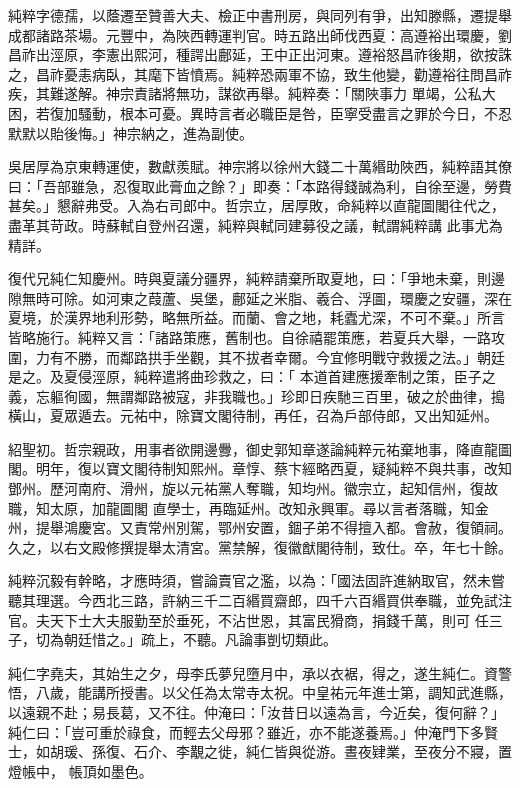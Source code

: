 \begin{pinyinscope}
 純粹字德孺，以蔭遷至贊善大夫、檢正中書刑房，與同列有爭，出知滕縣，遷提舉成都諸路茶場。元豐中，為陜西轉運判官。時五路出師伐西夏：高遵裕出環慶，劉昌祚出涇原，李憲出熙河，種諤出鄜延，王中正出河東。遵裕怒昌祚後期，欲按誅之，昌祚憂恚病臥，其麾下皆憤焉。純粹恐兩軍不協，致生他變，勸遵裕往問昌祚疾，其難遂解。神宗責諸將無功，謀欲再舉。純粹奏：「關陜事力
 單竭，公私大困，若復加騷動，根本可憂。異時言者必職臣是咎，臣寧受盡言之罪於今日，不忍默默以貽後悔。」神宗納之，進為副使。



 吳居厚為京東轉運使，數獻羨賦。神宗將以徐州大錢二十萬緡助陜西，純粹語其僚曰：「吾部雖急，忍復取此膏血之餘？」即奏：「本路得錢誠為利，自徐至邊，勞費甚矣。」懇辭弗受。入為右司郎中。哲宗立，居厚敗，命純粹以直龍圖閣往代之，盡革其苛政。時蘇軾自登州召還，純粹與軾同建募役之議，軾謂純粹講
 此事尤為精詳。



 復代兄純仁知慶州。時與夏議分疆界，純粹請棄所取夏地，曰：「爭地未棄，則邊隙無時可除。如河東之葭蘆、吳堡，鄜延之米脂、羲合、浮圖，環慶之安疆，深在夏境，於漢界地利形勢，略無所益。而蘭、會之地，耗蠹尤深，不可不棄。」所言皆略施行。純粹又言：「諸路策應，舊制也。自徐禧罷策應，若夏兵大舉，一路攻圍，力有不勝，而鄰路拱手坐觀，其不拔者幸爾。今宜修明戰守救援之法。」朝廷是之。及夏侵涇原，純粹遣將曲珍救之，曰：「
 本道首建應援牽制之策，臣子之義，忘軀徇國，無謂鄰路被寇，非我職也。」珍即日疾馳三百里，破之於曲律，搗橫山，夏眾遁去。元祐中，除寶文閣待制，再任，召為戶部侍郎，又出知延州。



 紹聖初。哲宗親政，用事者欲開邊釁，御史郭知章遂論純粹元祐棄地事，降直龍圖閣。明年，復以寶文閣待制知熙州。章惇、蔡卞經略西夏，疑純粹不與共事，改知鄧州。歷河南府、滑州，旋以元祐黨人奪職，知均州。徽宗立，起知信州，復故職，知太原，加龍圖閣
 直學士，再臨延州。改知永興軍。尋以言者落職，知金州，提舉鴻慶宮。又責常州別駕，鄂州安置，錮子弟不得擅入都。會赦，復領祠。久之，以右文殿修撰提舉太清宮。黨禁解，復徽猷閣待制，致仕。卒，年七十餘。



 純粹沉毅有幹略，才應時須，嘗論賣官之濫，以為：「國法固許進納取官，然未嘗聽其理選。今西北三路，許納三千二百緡買齋郎，四千六百緡買供奉職，並免試注官。夫天下士大夫服勤至於垂死，不沾世恩，其富民猾商，捐錢千萬，則可
 任三子，切為朝廷惜之。」疏上，不聽。凡論事剴切類此。



 純仁字堯夫，其始生之夕，母李氏夢兒墮月中，承以衣裾，得之，遂生純仁。資警悟，八歲，能講所授書。以父任為太常寺太祝。中皇祐元年進士第，調知武進縣，以遠親不赴；易長葛，又不往。仲淹曰：「汝昔日以遠為言，今近矣，復何辭？」純仁曰：「豈可重於祿食，而輕去父母邪？雖近，亦不能遂養焉。」仲淹門下多賢士，如胡瑗、孫復、石介、李覯之徙，純仁皆與從游。晝夜肄業，至夜分不寢，置燈帳中，
 帳頂如墨色。




\end{pinyinscope}
